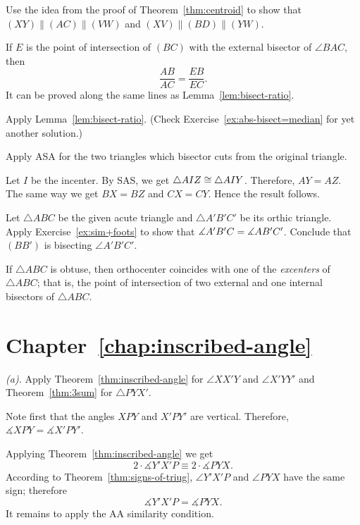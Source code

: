Use the idea from the proof of Theorem~\ref{thm:centroid}
to show that $(XY)\parallel (AC)\parallel (VW)$ and
$(XV)\parallel (BD)\parallel (YW)$.


If $E$ is the point of intersection of $(BC)$ 
with the external bisector of $\angle BAC$, then 
$$\frac{AB}{AC}=\frac{EB}{EC}.$$
It can be proved along the same lines as Lemma~\ref{lem:bisect-ratio}.

Apply Lemma~\ref{lem:bisect-ratio}.
(Check Exercise~\ref{ex:abs-bisect=median} for yet another solution.)


Apply ASA for the two triangles which bisector cuts from the original triangle. 

Let $I$ be the incenter.
By SAS, we get $\triangle AIZ\z\cong\triangle AIY$. Therefore, $AY=AZ$.
The same way we get $BX=BZ$ and $CX=CY$.
Hence the result follows.

Let $\triangle ABC$ be the given acute triangle and $\triangle A'B'C'$ 
be its orthic triangle.
Apply Exercise~\ref{ex:sim+foots} to show that 
$\measuredangle A'B'C\z=\measuredangle AB'C'$.
Conclude that $(BB')$ is bisecting $\angle A'B'C'$.

If $\triangle ABC$ is obtuse, then orthocenter coincides with one of the \emph{excenters} of $\triangle ABC$;
that is, 
the point of intersection of two external and one internal bisectors of $\triangle ABC$.
 

 

\section*{Chapter~\ref{chap:inscribed-angle}}
\setcounter{eqtn}{0}

 \textit{(a).}
Apply Theorem~\ref{thm:inscribed-angle} for $\angle XX'Y$ and $\angle X'YY'$
and Theorem~\ref{thm:3sum} for $\triangle PYX'$.

 Note first that the angles $XPY$ and $X'PY'$ are vertical.
Therefore, $\measuredangle XPY=\measuredangle X'PY'$.

Applying Theorem~\ref{thm:inscribed-angle} we get
$$2\cdot \measuredangle Y'X'P\equiv 2\cdot\measuredangle PYX.$$
According to Theorem~\ref{thm:signs-of-triug}, $\angle Y'X'P$ and $\angle PYX$ have the same sign;
therefore
$$\measuredangle Y'X'P= \measuredangle PYX.$$
It remains to apply the AA similarity condition.

